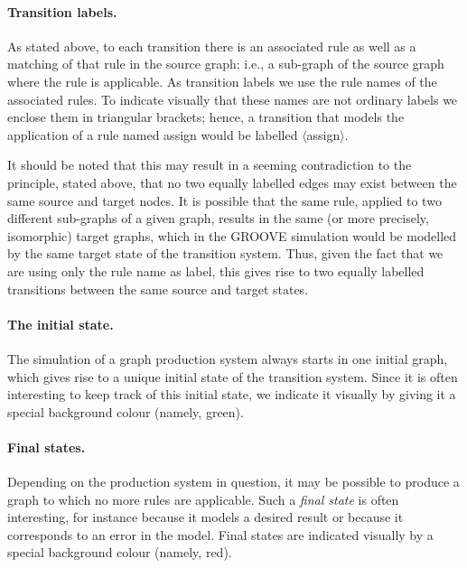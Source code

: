 \paragraph{Transition labels.}

As stated above, to each transition there is an associated rule as well as a
matching of that rule in the source graph; i.e., a sub-graph of the source
graph where the rule is applicable. As transition labels we use the rule names
of the associated rules. To indicate visually that these names are not ordinary
labels we enclose them in triangular brackets; hence, a transition that models
the application of a rule named \textsf{assign} would be labelled
\textsf{$\langle$assign$\rangle$}.

It should be noted that this may result in a seeming contradiction to the
principle, stated above, that no two equally labelled edges may exist between
the same source and target nodes. It is possible that the same rule, applied to
two different sub-graphs of a given graph, results in the same (or more
precisely, isomorphic) target graphs, which in the GROOVE simulation would be
modelled by the same target state of the transition system. Thus, given the
fact that we are using only the rule name as label, this gives rise to two
equally labelled transitions between the same source and target states.

\paragraph{The initial state.}

The simulation of a graph production system always starts in one initial graph,
which gives rise to a unique initial state of the transition system. Since it
is often interesting to keep track of this initial state, we indicate it
visually by giving it a special background colour (namely, green).

\paragraph{Final states.}

Depending on the production system in question, it may be possible to produce a
graph to which no more rules are applicable. Such a \emph{final state} is often
interesting, for instance because it models a desired result or because it
corresponds to an error in the model. Final states are indicated visually by a
special background colour (namely, red).


